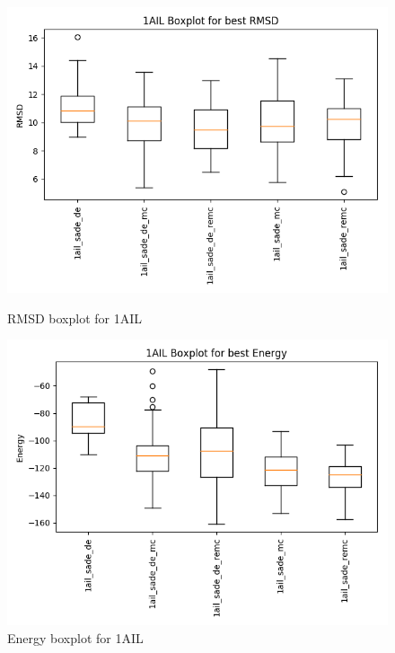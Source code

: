 \begin{figure}[ht]
    \begin{minipage}[b]{0.45\linewidth}
        \centering
        \includegraphics[width=\textwidth]{Figuras/boxplots/1ail_rmsd_boxplot.png}
        \caption{RMSD boxplot for 1AIL}
        \label{fig:1ail-rmsd-boxplot}
    \end{minipage}
    \hspace{0.5cm}
    \begin{minipage}[b]{0.45\linewidth}
        \centering
        \includegraphics[width=\textwidth]{Figuras/boxplots/1ail_energy_boxplot.png}
        \caption{Energy boxplot for 1AIL}
        \label{fig:1ail-energy-boxplot}
    \end{minipage}
\end{figure}

